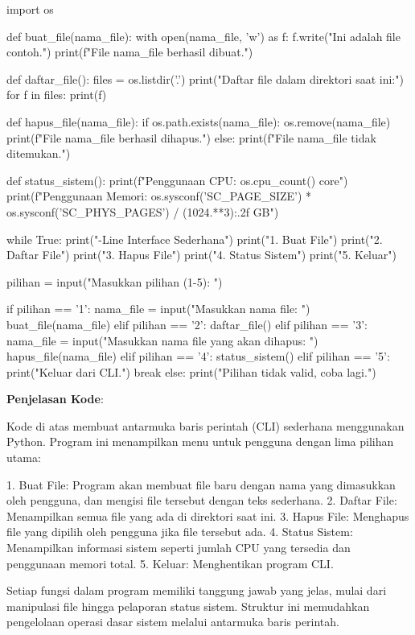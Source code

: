 \documentclass[12pt]{article}
\begin{document}
	\begin{python}
		import os
		
		def buat_file(nama_file):
		with open(nama_file, 'w') as f:
		f.write("Ini adalah file contoh.\n")
		print(f"File {nama_file} berhasil dibuat.")
		
		def daftar_file():
		files = os.listdir('.')
		print("Daftar file dalam direktori saat ini:")
		for f in files:
		print(f)
		
		def hapus_file(nama_file):
		if os.path.exists(nama_file):
		os.remove(nama_file)
		print(f"File {nama_file} berhasil dihapus.")
		else:
		print(f"File {nama_file} tidak ditemukan.")
		
		def status_sistem():
		print(f"Penggunaan CPU: {os.cpu_count()} core")
		print(f"Penggunaan Memori: {os.sysconf('SC_PAGE_SIZE') * os.sysconf('SC_PHYS_PAGES') / (1024.**3):.2f} GB")
		
		while True:
		print("\nCommand-Line Interface Sederhana")
		print("1. Buat File")
		print("2. Daftar File")
		print("3. Hapus File")
		print("4. Status Sistem")
		print("5. Keluar")
		
		pilihan = input("Masukkan pilihan (1-5): ")
		
		if pilihan == '1':
		nama_file = input("Masukkan nama file: ")
		buat_file(nama_file)
		elif pilihan == '2':
		daftar_file()
		elif pilihan == '3':
		nama_file = input("Masukkan nama file yang akan dihapus: ")
		hapus_file(nama_file)
		elif pilihan == '4':
		status_sistem()
		elif pilihan == '5':
		print("Keluar dari CLI.")
		break
		else:
		print("Pilihan tidak valid, coba lagi.")
	\end{python}
	
	\textbf{Penjelasan Kode}:
	
	Kode di atas membuat antarmuka baris perintah (CLI) sederhana menggunakan Python. Program ini menampilkan menu untuk pengguna dengan lima pilihan utama:
	
	1. Buat File: Program akan membuat file baru dengan nama yang dimasukkan oleh pengguna, dan mengisi file tersebut dengan teks sederhana.
	2. Daftar File: Menampilkan semua file yang ada di direktori saat ini.
	3. Hapus File: Menghapus file yang dipilih oleh pengguna jika file tersebut ada.
	4. Status Sistem: Menampilkan informasi sistem seperti jumlah CPU yang tersedia dan penggunaan memori total.
	5. Keluar: Menghentikan program CLI.
	
	Setiap fungsi dalam program memiliki tanggung jawab yang jelas, mulai dari manipulasi file hingga pelaporan status sistem. Struktur ini memudahkan pengelolaan operasi dasar sistem melalui antarmuka baris perintah.
	
\end{document}
